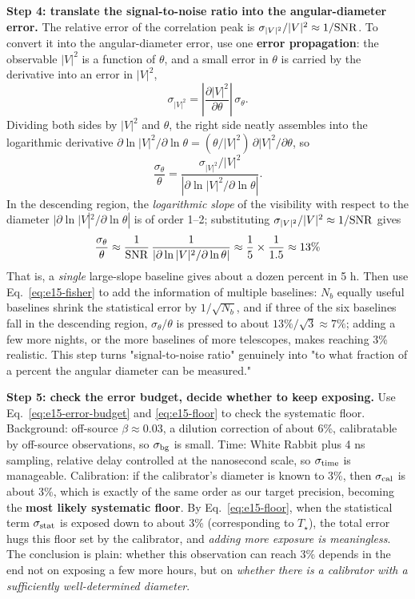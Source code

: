 \textbf{Step 4: translate the signal-to-noise ratio into the angular-diameter error.} The relative error of the correlation peak is $\sigma_{|V|^2}/|V|^2\approx1/{\rm SNR}$. To convert it into the angular-diameter error, use one \textbf{error propagation}: the observable $|V|^2$ is a function of $\theta$, and a small error in $\theta$ is carried by the derivative into an error in $|V|^2$,
\[
  \sigma_{|V|^2}=\left|\frac{\partial|V|^2}{\partial\theta}\right|\,\sigma_\theta .
\]
Dividing both sides by $|V|^2$ and $\theta$, the right side neatly assembles into the logarithmic derivative $\partial\ln|V|^2/\partial\ln\theta=(\theta/|V|^2)\,\partial|V|^2/\partial\theta$, so
\[
  \frac{\sigma_\theta}{\theta}
  =\frac{\sigma_{|V|^2}/|V|^2}{\left|\partial\ln|V|^2/\partial\ln\theta\right|} .
\]
In the descending region, the \emph{logarithmic slope} of the visibility with respect to the diameter $|\partial\ln|V|^2/\partial\ln\theta|$ is of order 1--2; substituting $\sigma_{|V|^2}/|V|^2\approx1/{\rm SNR}$ gives
\[
  \frac{\sigma_\theta}{\theta}
  \approx\frac{1}{{\rm SNR}}\,
  \frac{1}{\left|\partial\ln|V|^2/\partial\ln\theta\right|}
  \approx\frac{1}{5}\times\frac{1}{1.5}
  \approx13\%
\]
That is, a \emph{single} large-slope baseline gives about a dozen percent in 5 h. Then use Eq.~\eqref{eq:e15-fisher} to add the information of multiple baselines: $N_b$ equally useful baselines shrink the statistical error by $1/\sqrt{N_b}$, and if three of the six baselines fall in the descending region, $\sigma_\theta/\theta$ is pressed to about $13\%/\sqrt3\approx7\%$; adding a few more nights, or the more baselines of more telescopes, makes reaching 3\% realistic. This step turns "signal-to-noise ratio" genuinely into "to what fraction of a percent the angular diameter can be measured."

\textbf{Step 5: check the error budget, decide whether to keep exposing.} Use Eq.~\eqref{eq:e15-error-budget} and \eqref{eq:e15-floor} to check the systematic floor. Background: off-source $\beta\approx0.03$, a dilution correction of about 6\%, calibratable by off-source observations, so $\sigma_{\rm bg}$ is small. Time: White Rabbit plus 4 ns sampling, relative delay controlled at the nanosecond scale, so $\sigma_{\rm time}$ is manageable. Calibration: if the calibrator's diameter is known to 3\%, then $\sigma_{\rm cal}$ is about 3\%, which is exactly of the same order as our target precision, becoming the \textbf{most likely systematic floor}. By Eq.~\eqref{eq:e15-floor}, when the statistical term $\sigma_{\rm stat}$ is exposed down to about 3\% (corresponding to $T_\star$), the total error hugs this floor set by the calibrator, and \emph{adding more exposure is meaningless}. The conclusion is plain: whether this observation can reach 3\% depends in the end not on exposing a few more hours, but on \emph{whether there is a calibrator with a sufficiently well-determined diameter}.

